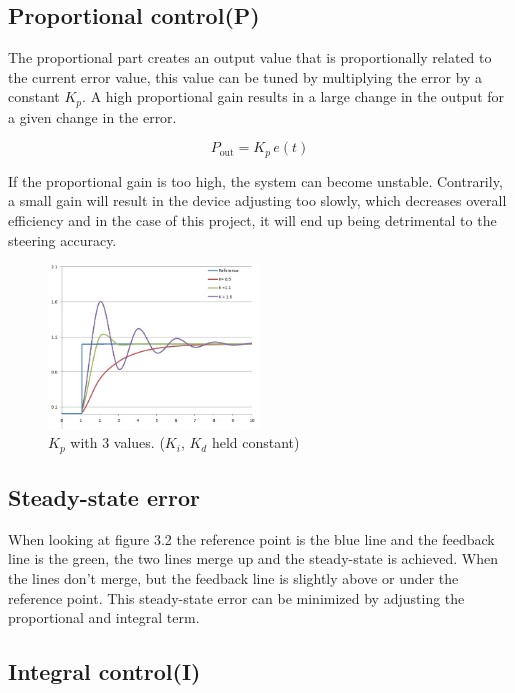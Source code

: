 \subsection {Proportional control(P)}

The proportional part creates an output value that is proportionally related to the current error value, this value can be tuned by multiplying the error by a constant $K_p$. A high proportional gain results in a large change in the output for a given change in the error. 


$$ P_{\mathrm{out}}=K_p\,{e(t)}$$  

If the proportional gain is too high, the system can become unstable. Contrarily, a small gain will result in the device adjusting too slowly, which decreases overall efficiency and in the case of this project, it will end up being detrimental to the steering accuracy.


\begin{figure}[h!]
  \centering
  \includegraphics[width=0.5\textwidth]{figures/PIDP.jpg}
  
  \caption{$K_p$ with 3 values. ($K_i$, $K_d$ held constant)} 
  \label{PID controller}
\end{figure}

\subsection {Steady-state error}

When looking at figure 3.2 the reference point is the blue line and the feedback line is the green, the two lines merge up and the steady-state is achieved. When the lines don't merge, but the feedback line is slightly above or under the reference point. This steady-state error can be minimized by adjusting the proportional and integral term. 

\subsection {Integral control(I)}

